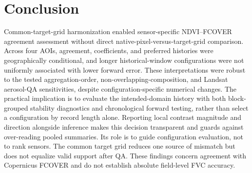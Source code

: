 \section{Conclusion}
Common-target-grid harmonization enabled sensor-specific NDVI--FCOVER agreement assessment without direct native-pixel-versus-target-grid comparison. Across four AOIs, agreement, coefficients, and preferred histories were geographically conditional, and longer historical-window configurations were not uniformly associated with lower forward error. These interpretations were robust to the tested aggregation-order, non-overlapping-composition, and Landsat aerosol-QA sensitivities, despite configuration-specific numerical changes. The practical implication is to evaluate the intended-domain history with both block-grouped stability diagnostics and chronological forward testing, rather than select a configuration by record length alone. Reporting local contrast magnitude and direction alongside inference makes this decision transparent and guards against over-reading pooled summaries. Its role is to guide configuration evaluation, not to rank sensors. The common target grid reduces one source of mismatch but does not equalize valid support after QA. These findings concern agreement with Copernicus FCOVER and do not establish absolute field-level FVC accuracy.
